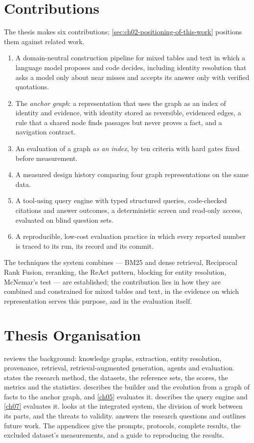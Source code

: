 \section{Contributions}\label{sec:ch01-contributions}

The thesis makes six contributions; \cref{sec:ch02-positioning-of-this-work} positions them against related work.
\begin{enumerate}[nosep]
\item A domain-neutral construction pipeline for mixed tables and text in which a language model proposes and code
decides, including identity resolution that asks a model only about near misses and accepts its answer only with
verified quotations.
\item The \emph{anchor graph}: a representation that uses the graph as an index of identity and evidence, with identity
stored as reversible, evidenced edges, a rule that a shared node finds passages but never proves a fact, and a
navigation contract.
\item An evaluation of a graph \emph{as an index}, by ten criteria with hard gates fixed before measurement.
\item A measured design history comparing four graph representations on the same data.
\item A tool-using query engine with typed structured queries, code-checked citations and answer outcomes, a
deterministic screen and read-only access, evaluated on blind question sets.
\item A reproducible, low-cost evaluation practice in which every reported number is traced to its run, its record and
its commit.
\end{enumerate}
The techniques the system combines --- BM25 and dense retrieval, Reciprocal Rank Fusion, reranking, the ReAct pattern,
blocking for entity resolution, McNemar's test --- are established; the contribution lies in how they are combined and
constrained for mixed tables and text, in the evidence on which representation serves this purpose, and in the
evaluation itself.

\section{Thesis Organisation}\label{sec:ch01-thesis-organisation}

 reviews the background: knowledge graphs, extraction, entity resolution, provenance, retrieval,
retrieval-augmented generation, agents and evaluation.  states the research method, the datasets, the
reference sets, the scores, the metrics and the statistics.  describes the builder and the evolution from a
graph of facts to the anchor graph, and \cref{ch05} evaluates it.  describes the query engine and
\cref{ch07} evaluates it.  looks at the integrated system, the division of work between its parts, and the
threats to validity.  answers the research questions and outlines future work. The appendices give the
prompts, protocols, complete results, the excluded dataset's measurements, and a guide to reproducing the results.
